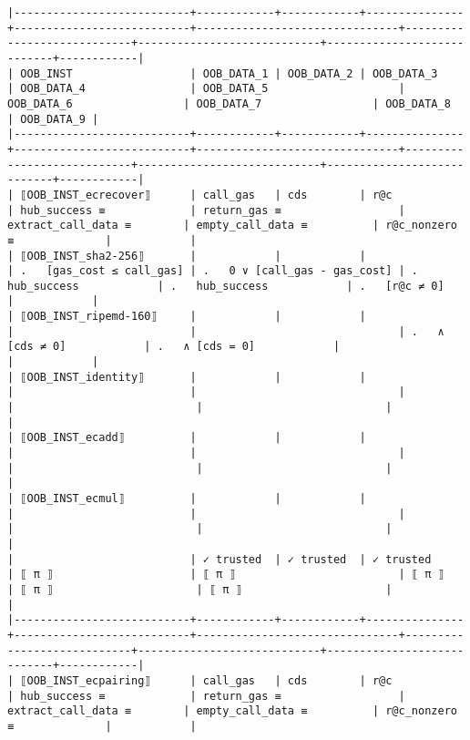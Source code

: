 \documentclass[varwidth=\maxdimen,margin=0.5cm,multi={verbatim}]{standalone}
\begin{document}
\begin{verbatim}
|---------------------------+------------+------------+---------------+---------------------------+-------------------------------+----------------------------+----------------------------+----------------------------+------------|
| OOB_INST                  | OOB_DATA_1 | OOB_DATA_2 | OOB_DATA_3    | OOB_DATA_4                | OOB_DATA_5                    | OOB_DATA_6                 | OOB_DATA_7                 | OOB_DATA_8                 | OOB_DATA_9 |
|---------------------------+------------+------------+---------------+---------------------------+-------------------------------+----------------------------+----------------------------+----------------------------+------------|
| ⟦OOB_INST_ecrecover⟧      | call_gas   | cds        | r@c           | hub_success ≡             | return_gas ≡                  | extract_call_data ≡        | empty_call_data ≡          | r@c_nonzero ≡              |            |
| ⟦OOB_INST_sha2-256⟧       |            |            |               | .   [gas_cost ≤ call_gas] | .   0 ∨ [call_gas - gas_cost] | .   hub_success            | .   hub_success            | .   [r@c ≠ 0]              |            |
| ⟦OOB_INST_ripemd-160⟧     |            |            |               |                           |                               | .   ∧ [cds ≠ 0]            | .   ∧ [cds = 0]            |                            |            |
| ⟦OOB_INST_identity⟧       |            |            |               |                           |                               |                            |                            |                            |            |
| ⟦OOB_INST_ecadd⟧          |            |            |               |                           |                               |                            |                            |                            |            |
| ⟦OOB_INST_ecmul⟧          |            |            |               |                           |                               |                            |                            |                            |            |
|                           | ✓ trusted  | ✓ trusted  | ✓ trusted     | ⟦ π ⟧                     | ⟦ π ⟧                         | ⟦ π ⟧                      | ⟦ π ⟧                      | ⟦ π ⟧                      |            |
|---------------------------+------------+------------+---------------+---------------------------+-------------------------------+----------------------------+----------------------------+----------------------------+------------|
| ⟦OOB_INST_ecpairing⟧      | call_gas   | cds        | r@c           | hub_success ≡             | return_gas ≡                  | extract_call_data ≡        | empty_call_data ≡          | r@c_nonzero ≡              |            |

\end{verbatim}
\end{document}
